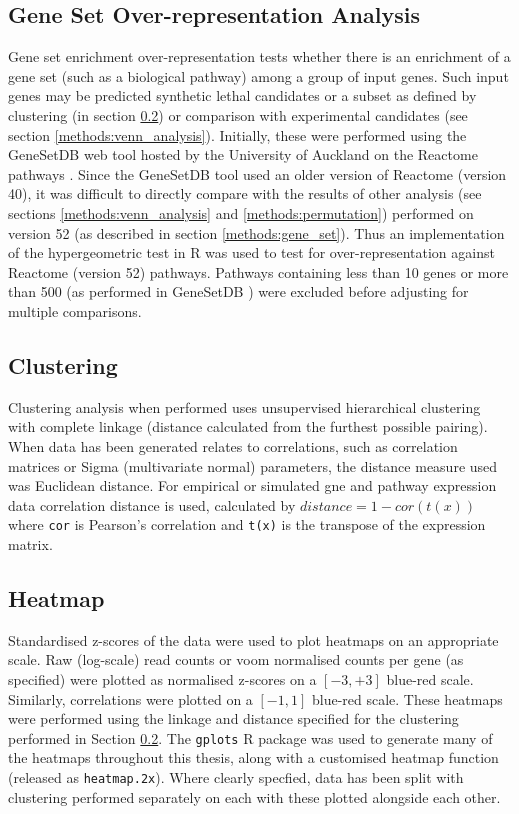 \subsection{Gene Set Over-representation Analysis}
Gene set enrichment over-representation tests whether there is an enrichment of a gene set (such as a biological pathway) among a group of input genes. Such input genes may be predicted synthetic lethal candidates or a subset as defined by clustering (in section \ref{methods:clustering}) or comparison with experimental candidates (see section \ref{methods:venn_analysis}). Initially, these were performed using the GeneSetDB web tool \citep{genesetdb} hosted by the University of Auckland on the Reactome pathways \citep{reactome}. Since the GeneSetDB tool used an older version of Reactome (version 40), it was difficult to directly compare with the results of other analysis (see sections \ref{methods:venn_analysis} and \ref{methods:permutation}) performed on version 52 (as described in  section \ref{methods:gene_set}). Thus an implementation of the hypergeometric test in R \citep{R_core} was used to test for over-representation against Reactome (version 52) pathways. Pathways containing less than 10 genes or more than 500 (as performed in GeneSetDB \citep{genesetdb}) were excluded before adjusting for multiple comparisons.

\subsection{Clustering} \label{methods:clustering}
Clustering analysis when performed uses unsupervised hierarchical clustering with complete linkage (distance calculated from the furthest possible pairing). When data has been generated relates to correlations, such as correlation matrices or Sigma (multivariate normal) parameters, the distance measure used was Euclidean distance. For empirical or simulated gne and pathway expression data correlation distance is used, calculated by $distance = 1 - cor(t(x))$ where \texttt{cor} is Pearson's correlation and \texttt{t(x)} is the transpose of the expression matrix. 

\subsection{Heatmap} \label{methods:heatmap}
Standardised z-scores of the data were used to plot heatmaps on an appropriate scale. Raw (log-scale) read counts or voom normalised counts per gene (as specified) were plotted  as normalised z-scores on a $[-3,+3]$ blue-red scale. Similarly, correlations were plotted on a $[-1,1]$ blue-red scale. These heatmaps were performed using the linkage and distance specified for the clustering performed in Section \ref{methods:clustering}. The \texttt{gplots} R package \citep{gplots} was used to generate many of the heatmaps throughout this thesis, along with a customised heatmap function (released as \texttt{heatmap.2x}). Where clearly specfied, data has been split with clustering performed separately on each with these plotted alongside each other.

